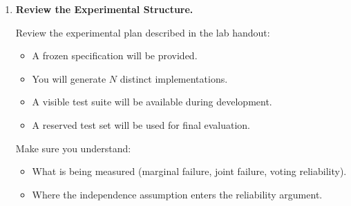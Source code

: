 \begin{enumerate}
  Regardless of the system you choose, confirm that you can:

  \begin{itemize}
    \item Start a fresh session (to create independent ``versions'').
    \item Provide a specification and obtain generated source code.
    \item Run the generated code locally against a simple test suite.
  \end{itemize}

  \item \textbf{Review the Experimental Structure.}

  Review the experimental plan described in the lab handout:

  \begin{itemize}
    \item A frozen specification will be provided.
    \item You will generate $N$ distinct implementations.
    \item A visible test suite will be available during development.
    \item A reserved test set will be used for final evaluation.
  \end{itemize}

  Make sure you understand:

  \begin{itemize}
    \item What is being measured (marginal failure, joint failure, voting reliability).
    \item Where the independence assumption enters the reliability argument.
  \end{itemize}

\end{enumerate}

